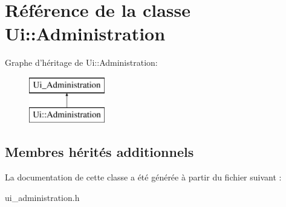 \hypertarget{class_ui_1_1_administration}{\section{Référence de la classe Ui\+:\+:Administration}
\label{class_ui_1_1_administration}
}
Graphe d'héritage de Ui\+:\+:Administration\+:\begin{figure}[H]
\begin{center}
\leavevmode
\includegraphics[height=2.000000cm]{class_ui_1_1_administration}
\end{center}
\end{figure}
\subsection*{Membres hérités additionnels}


La documentation de cette classe a été générée à partir du fichier suivant \+:\begin{DoxyCompactItemize}
\item 
ui\+\_\+administration.\+h\end{DoxyCompactItemize}
